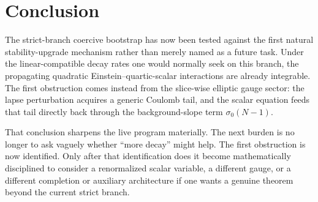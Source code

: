 \documentclass[11pt]{article}
\begin{document}
\section{Conclusion}

The strict-branch coercive bootstrap has now been tested against the first natural stability-upgrade mechanism rather than merely named as a future task. Under the linear-compatible decay rates one would normally seek on this branch, the propagating quadratic Einstein--quartic-scalar interactions are already integrable. The first obstruction comes instead from the slice-wise elliptic gauge sector: the lapse perturbation acquires a generic Coulomb tail, and the scalar equation feeds that tail directly back through the background-slope term \(\sigma_0(N-1)\).

That conclusion sharpens the live program materially. The next burden is no longer to ask vaguely whether ``more decay'' might help. The first obstruction is now identified. Only after that identification does it become mathematically disciplined to consider a renormalized scalar variable, a different gauge, or a different completion or auxiliary architecture if one wants a genuine theorem beyond the current strict branch.
\end{document}
